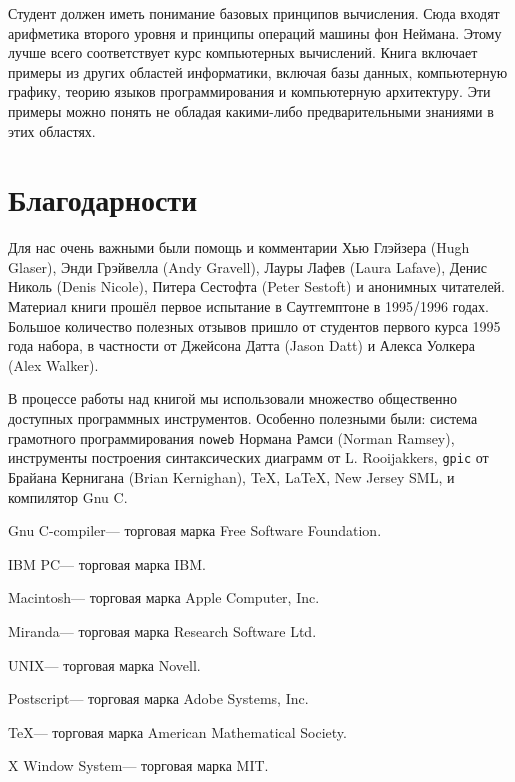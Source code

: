Студент должен иметь понимание базовых принципов вычисления. Сюда входят арифметика второго уровня и принципы операций машины фон Неймана. Этому лучше всего соответствует курс компьютерных вычислений. Книга включает примеры из других областей информатики, включая базы данных, компьютерную графику, теорию языков программирования и компьютерную архитектуру. Эти примеры можно понять не обладая какими-либо предварительными знаниями в этих областях.

\section*{Благодарности}

Для нас очень важными были помощь и комментарии Хью Глэйзера (Hugh Glaser), Энди Грэйвелла (Andy Gravell), Лауры Лафев (Laura Lafave), Денис Николь (Denis Nicole), Питера Сестофта (Peter Sestoft) и анонимных читателей. Материал книги прошёл первое испытание в Саутгемптоне в 1995/1996 годах. Большое количество полезных отзывов пришло от студентов первого курса 1995 года набора, в частности от Джейсона Датта (Jason Datt) и Алекса Уолкера (Alex Walker).

В процессе работы над книгой мы использовали множество общественно доступных программных инструментов. Особенно полезными были: система грамотного программирования \lstinline|noweb| Нормана Рамси ({Norman Ramsey}), инструменты построения синтаксических диаграмм от L. Rooijakkers, \lstinline|gpic| от Брайана Кернигана (Brian Kernighan), \TeX, \LaTeX, New Jersey SML, и компилятор Gnu C.

Gnu C-compiler\texttrademark --- торговая марка Free Software Foundation.

IBM PC\texttrademark --- торговая марка IBM.

Macintosh\texttrademark --- торговая марка Apple Computer, Inc.

Miranda\texttrademark --- торговая марка Research Software Ltd.

UNIX\texttrademark --- торговая марка Novell.

Postscript\texttrademark --- торговая марка Adobe Systems, Inc.

\TeX\texttrademark --- торговая марка American Mathematical Society.

X Window System\texttrademark --- торговая марка MIT.


